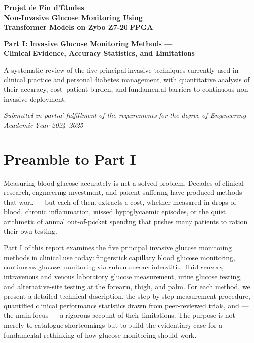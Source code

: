 \begin{titlepage}
\centering
\vspace*{2cm}
{\LARGE\bfseries Projet de Fin d'\'Etudes\\[0.5em]
Non-Invasive Glucose Monitoring Using\\
Transformer Models on Zybo Z7-20 FPGA\par}
\vspace{1.5cm}
{\Large\bfseries Part I: Invasive Glucose Monitoring Methods ---\\
Clinical Evidence, Accuracy Statistics, and Limitations\par}
\vspace{2cm}
{\large A systematic review of the five principal invasive techniques
currently used in clinical practice and personal diabetes management,
with quantitative analysis of their accuracy, cost, patient burden,
and fundamental barriers to continuous non-invasive deployment.\par}
\vspace{3cm}
{\large\itshape Submitted in partial fulfillment of the requirements
for the degree of Engineering\\[0.5em]
Academic Year 2024--2025\par}
\vfill
\end{titlepage}

\tableofcontents
\newpage

\chapter*{Preamble to Part I}

Measuring blood glucose accurately is not a solved problem. Decades of clinical research, engineering investment, and patient suffering have produced methods that work --- but each of them extracts a cost, whether measured in drops of blood, chronic inflammation, missed hypoglycaemic episodes, or the quiet arithmetic of annual out-of-pocket spending that pushes many patients to ration their own testing.

Part I of this report examines the five principal invasive glucose monitoring methods in clinical use today: fingerstick capillary blood glucose monitoring, continuous glucose monitoring via subcutaneous interstitial fluid sensors, intravenous and venous laboratory glucose measurement, urine glucose testing, and alternative-site testing at the forearm, thigh, and palm. For each method, we present a detailed technical description, the step-by-step measurement procedure, quantified clinical performance statistics drawn from peer-reviewed trials, and --- the main focus --- a rigorous account of their limitations. The purpose is not merely to catalogue shortcomings but to build the evidentiary case for a fundamental rethinking of how glucose monitoring should work.

